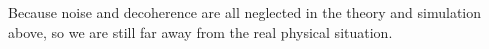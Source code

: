 	Because  noise and decoherence are all neglected in the theory and simulation above, so we are still far away from the real physical situation.













